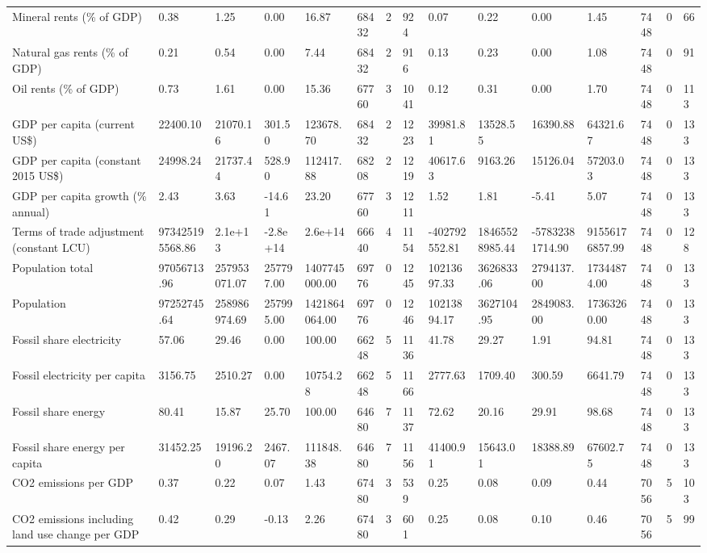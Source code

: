 \begin{longtable}{lllllllllllllll}
\addlinespace
Mineral rents (\% of GDP) & 0.38 & 1.25 & 0.00 & 16.87 & 68432 & 2 & 924 & 0.07 & 0.22 & 0.00 & 1.45 & 7448 & 0 & 66\\
Natural gas rents (\% of GDP) & 0.21 & 0.54 & 0.00 & 7.44 & 68432 & 2 & 916 & 0.13 & 0.23 & 0.00 & 1.08 & 7448 & 0 & 91\\
Oil rents (\% of GDP) & 0.73 & 1.61 & 0.00 & 15.36 & 67760 & 3 & 1041 & 0.12 & 0.31 & 0.00 & 1.70 & 7448 & 0 & 113\\
GDP per capita (current US\$) & 22400.10 & 21070.16 & 301.50 & 123678.70 & 68432 & 2 & 1223 & 39981.81 & 13528.55 & 16390.88 & 64321.67 & 7448 & 0 & 133\\
GDP per capita (constant 2015 US\$) & 24998.24 & 21737.44 & 528.90 & 112417.88 & 68208 & 2 & 1219 & 40617.63 & 9163.26 & 15126.04 & 57203.03 & 7448 & 0 & 133\\
\addlinespace
GDP per capita growth (\% annual) & 2.43 & 3.63 & -14.61 & 23.20 & 67760 & 3 & 1211 & 1.52 & 1.81 & -5.41 & 5.07 & 7448 & 0 & 133\\
Terms of trade adjustment (constant LCU) & 973425195568.86 & 2.1e+13 & -2.8e+14 & 2.6e+14 & 66640 & 4 & 1154 & -402792552.81 & 18465528985.44 & -57832381714.90 & 91556176857.99 & 7448 & 0 & 128\\
Population total & 97056713.96 & 257953071.07 & 257797.00 & 1407745000.00 & 69776 & 0 & 1245 & 10213697.33 & 3626833.06 & 2794137.00 & 17344874.00 & 7448 & 0 & 133\\
Population & 97252745.64 & 258986974.69 & 257995.00 & 1421864064.00 & 69776 & 0 & 1246 & 10213894.17 & 3627104.95 & 2849083.00 & 17363260.00 & 7448 & 0 & 133\\
Fossil share electricity & 57.06 & 29.46 & 0.00 & 100.00 & 66248 & 5 & 1136 & 41.78 & 29.27 & 1.91 & 94.81 & 7448 & 0 & 133\\
\addlinespace
Fossil electricity per capita & 3156.75 & 2510.27 & 0.00 & 10754.28 & 66248 & 5 & 1166 & 2777.63 & 1709.40 & 300.59 & 6641.79 & 7448 & 0 & 133\\
Fossil share energy & 80.41 & 15.87 & 25.70 & 100.00 & 64680 & 7 & 1137 & 72.62 & 20.16 & 29.91 & 98.68 & 7448 & 0 & 133\\
Fossil share energy per capita & 31452.25 & 19196.20 & 2467.07 & 111848.38 & 64680 & 7 & 1156 & 41400.91 & 15643.01 & 18388.89 & 67602.75 & 7448 & 0 & 133\\
CO2 emissions per GDP & 0.37 & 0.22 & 0.07 & 1.43 & 67480 & 3 & 539 & 0.25 & 0.08 & 0.09 & 0.44 & 7056 & 5 & 103\\
CO2 emissions including land use change per GDP & 0.42 & 0.29 & -0.13 & 2.26 & 67480 & 3 & 601 & 0.25 & 0.08 & 0.10 & 0.46 & 7056 & 5 & 99\\

\end{longtable}
